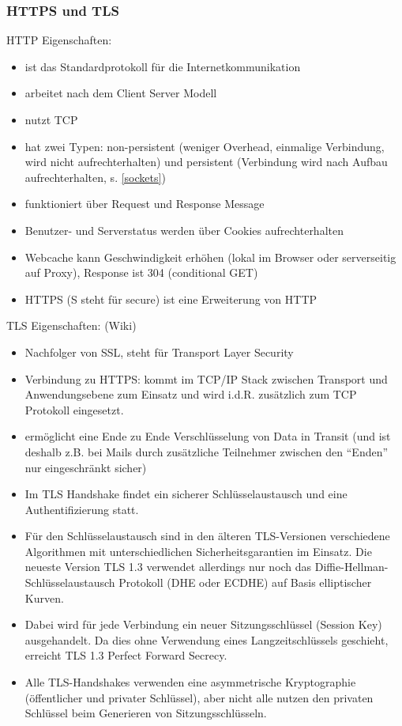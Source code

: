 \documentclass[notitlepage, hidelinks]{article}
\begin{document}
\subsubsection{HTTPS und TLS}
HTTP Eigenschaften:
\begin{itemize}
\item ist das Standardprotokoll für die Internetkommunikation
\item arbeitet nach dem Client Server Modell
\item nutzt TCP
\item hat zwei Typen: non-persistent (weniger Overhead, einmalige Verbindung, wird nicht aufrechterhalten) und persistent (Verbindung wird nach Aufbau aufrechterhalten, s. \ref{sockets})
\item funktioniert über Request und Response Message
\item Benutzer- und Serverstatus werden über Cookies aufrechterhalten
\item Webcache kann Geschwindigkeit erhöhen (lokal im Browser oder serverseitig auf Proxy), Response ist 304 (conditional GET)
\item HTTPS (S steht für secure) ist eine Erweiterung von HTTP
\end{itemize}

TLS Eigenschaften: (Wiki)
\begin{itemize}
\item Nachfolger von SSL, steht für Transport Layer Security
\item Verbindung zu HTTPS: kommt im TCP/IP Stack zwischen Transport und Anwendungsebene zum Einsatz und wird i.d.R. zusätzlich zum TCP Protokoll eingesetzt. 
\item ermöglicht eine Ende zu Ende Verschlüsselung von Data in Transit (und ist deshalb z.B. bei Mails durch zusätzliche Teilnehmer zwischen den ``Enden'' nur eingeschränkt sicher)
\item Im TLS Handshake findet ein sicherer Schlüsselaustausch und eine Authentifizierung statt.
\item Für den Schlüsselaustausch sind in den älteren TLS-Versionen verschiedene Algorithmen mit unterschiedlichen Sicherheitsgarantien im Einsatz. Die neueste Version TLS 1.3 verwendet allerdings nur noch das Diffie-Hellman-Schlüsselaustausch Protokoll (DHE oder ECDHE) auf Basis elliptischer Kurven.
\item Dabei wird für jede Verbindung ein neuer Sitzungsschlüssel (Session Key) ausgehandelt. Da dies ohne Verwendung eines Langzeitschlüssels geschieht, erreicht TLS 1.3 Perfect Forward Secrecy.
\item Alle TLS-Handshakes verwenden eine asymmetrische Kryptographie (öffentlicher und privater Schlüssel), aber nicht alle nutzen den privaten Schlüssel beim Generieren von Sitzungsschlüsseln.
\end{itemize}
\end{document}
